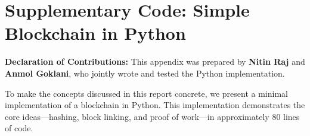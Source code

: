 \chapter{Supplementary Code: Simple Blockchain in Python}
\label{app:code}

\noindent\textbf{Declaration of Contributions:} This appendix was prepared by \textbf{Nitin Raj} and \textbf{Anmol Goklani}, who jointly wrote and tested the Python implementation.

\bigskip

To make the concepts discussed in this report concrete, we present a minimal implementation of a blockchain in Python. This implementation demonstrates the core ideas---hashing, block linking, and proof of work---in approximately 80 lines of code.

